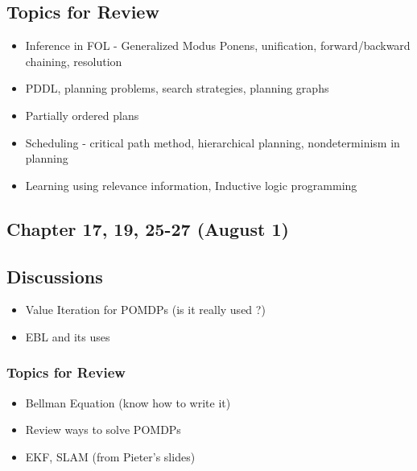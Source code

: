 \subsection*{Topics for Review}
\begin{itemize}
\item Inference in FOL - Generalized Modus Ponens, unification, forward/backward chaining, resolution
\item PDDL, planning problems, search strategies, planning graphs
\item Partially ordered plans
\item Scheduling - critical path method, hierarchical planning, nondeterminism in planning
\item Learning using relevance information, Inductive logic programming
\end{itemize}

\subsection{Chapter 17, 19, 25-27 (August 1)}
\subsection*{Discussions}
\begin{itemize}
\item Value Iteration for POMDPs (is it really used ?)
\item EBL and its uses
\end{itemize}

\subsubsection*{Topics for Review}
\begin{itemize}
\item Bellman Equation (know how to write it)
\item Review ways to solve POMDPs
\item EKF, SLAM (from Pieter's slides)
\end{itemize}
